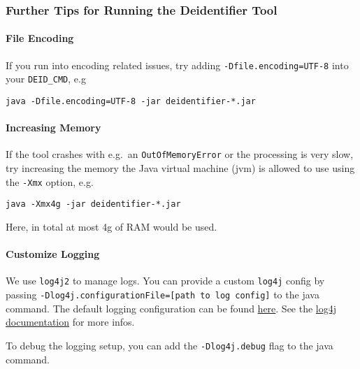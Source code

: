 \subsubsection{Further Tips for Running the Deidentifier
Tool}\label{further-tips-for-running-the-deidentifier-tool}

\paragraph{File Encoding}\label{file-encoding}

If you run into encoding related issues, try adding
\texttt{-Dfile.encoding=UTF-8} into your \texttt{DEID\_CMD}, e.g

\begin{verbatim}
java -Dfile.encoding=UTF-8 -jar deidentifier-*.jar
\end{verbatim}

\paragraph{Increasing Memory}\label{increasing-memory}

If the tool crashes with e.g.~an \texttt{OutOfMemoryError} or the
processing is very slow, try increasing the memory the Java virtual
machine (jvm) is allowed to use using the \texttt{-Xmx} option, e.g.

\begin{verbatim}
java -Xmx4g -jar deidentifier-*.jar
\end{verbatim}

Here, in total at most 4g of RAM would be used.

\paragraph{Customize Logging}\label{customize-logging}

We use \texttt{log4j2} to manage logs. You can provide a custom
\texttt{log4j} config by passing
\texttt{-Dlog4j.configurationFile={[}path\ to\ log\ config{]}} to the
java command. The default logging configuration can be found
\href{https://github.com/ratschlab/medical-reports-deidentification/blob/main/deidentifier-pipeline/src/main/resources/log4j2.xml}{here}. See
the
\href{https://logging.apache.org/log4j/2.x/manual/configuration.html}{log4j
documentation} for more infos.

To debug the logging setup, you can add the \texttt{-Dlog4j.debug} flag
to the java command.

